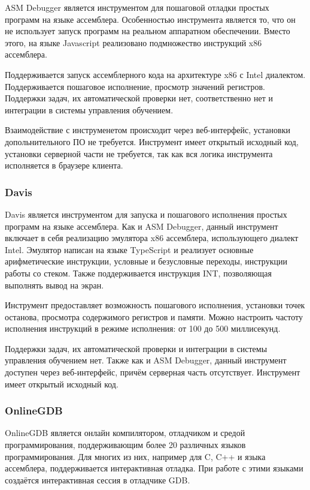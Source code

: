 \documentclass[a4paper,article,14pt]{extarticle}
\begin{document}
ASM Debugger\cite{asmdebugger} является инструментом для пошаговой отладки простых программ на языке ассемблера. Особенностью инструмента является то, что он не использует запуск программ на реальном аппаратном обеспечении. Вместо этого, на языке Javascript реализовано подмножество инструкций x86 ассемблера.

Поддерживается запуск ассемблерного кода на архитектуре x86 с Intel диалектом. Поддерживается пошаговое исполнение, просмотр значений регистров. Поддержки задач, их автоматической проверки нет, соответственно нет и интеграции в системы управления обучением.

Взаимодействие с инструменетом происходит через веб-интерфейс, установки допольнительного ПО не требуется. Инструмент имеет открытый исходный код, установки серверной части не требуется, так как вся логика инструмента исполняется в браузере клиента.

\subsubsection{Davis}

Davis\cite{davis} является инструментом для запуска и пошагового исполнения простых программ на языке ассемблера. Как и ASM Debugger, данный инструмент включает в себя реализацию эмулятора x86 ассемблера, использующего диалект Intel. Эмулятор написан на языке TypeScript и реализует основные арифметические инструкции, условные и безусловные переходы, инструкции работы со стеком. Также поддерживается инструкция INT, позволяющая выполнять вывод на экран.

Инструмент предоставляет возможность пошагового исполнения, установки точек останова, просмотра содержимого регистров и памяти. Можно настроить частоту исполнения инструкций в режиме исполнения: от 100 до 500 миллисекунд.

Поддержки задач, их автоматической проверки и интеграции в системы управления обучением нет. Также как и ASM Debugger, данный инструмент доступен через веб-интерфейс, причём серверная часть отсутствует. Инструмент имеет открытый исходный код.

\subsubsection{OnlineGDB}

OnlineGDB\cite{onlinegdb} является онлайн компилятором, отладчиком и средой программирования, поддерживающим более 20 различных языков программирования. Для многих из них, например для C, C++ и языка ассемблера, поддерживается интерактивная отладка. При работе с этими языками создаётся интерактивная сессия в отладчике GDB.
\end{document}
